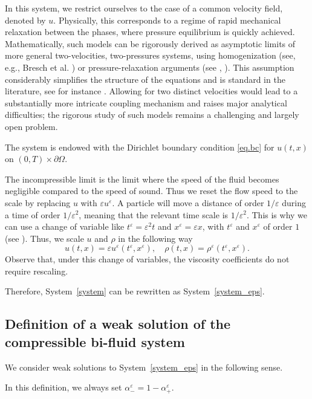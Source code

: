 \documentclass[11pt, twoside, a4paper]{article}
\theoremstyle{plain}
\theoremstyle{remark}
\numberwithin{equation}{section}
\newcommand{\eps}{\varepsilon}
\begin{document}
In this system, we restrict ourselves to the case of a common velocity field, denoted by $u$. Physically, this corresponds to a regime of rapid mechanical relaxation between the phases, where pressure equilibrium is quickly achieved. Mathematically, such models can be rigorously derived as asymptotic limits of more general two-velocities, two-pressures systems, using homogenization (see, e.g., Bresch et al. \cite{bresch2023mathematical}) or pressure-relaxation arguments (see \cite{burtea2023pressure}, \cite{burtea2026relaxation}). This assumption considerably simplifies the structure of the equations and is standard in the literature, see for instance \cite{novotny2020weak}. Allowing for two distinct velocities would lead to a substantially more intricate coupling mechanism and raises major analytical difficulties; the rigorous study of such models remains a challenging and largely open problem.

The system is endowed with the Dirichlet boundary condition \eqref{eq.bc} for $u(t,x)$ on $(0,T) \times \partial \Omega$.

The incompressible limit is the limit where the speed of the fluid becomes negligible compared to the speed of sound. Thus we reset the flow speed to the scale by replacing $u$ with $\eps u^\eps$. A particle will move a distance of order $1/\eps$ during a time of order $1/\eps^2$, meaning that the relevant time scale is $1/\eps^2$. This is why we can use a change of variable like $t^\eps=\eps^2 t$ and $x^\eps = \eps x$, with $t^\eps$ and $x^\eps$ of order $1$ (see \cite{danchin2005low}). Thus, we scale $u$ and $\rho$ in the following way
\begin{equation*}
 u(t,x) = \eps u^\eps(t^\eps,x^\eps), \quad \rho(t,x) = \rho^\eps(t^\eps,x^\eps).
\end{equation*}
Observe that, under this change of variables, the viscosity coefficients do not require rescaling.

Therefore, System~\eqref{system} can be rewritten as System~\eqref{system_eps}.

\subsection{Definition of a weak solution of the compressible bi-fluid system}

We consider weak solutions to System~\eqref{system_eps} in the following sense.

In this definition, we always set $\alpha_-^\eps = 1-\alpha_+^\eps$.
\end{document}
